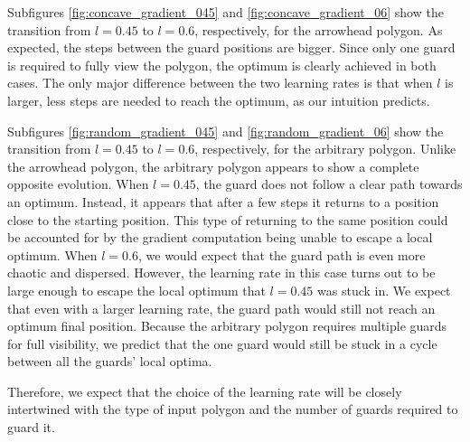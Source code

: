 Subfigures \ref{fig:concave_gradient_045} and \ref{fig:concave_gradient_06} show the transition from $l = 0.45$ to $l = 0.6$, respectively, for the arrowhead polygon. As expected, the steps between the guard positions are bigger. Since only one guard is required to fully view the polygon, the optimum is clearly achieved in both cases. The only major difference between the two learning rates is that when $l$ is larger, less steps are needed to reach the optimum, as our intuition predicts.

Subfigures \ref{fig:random_gradient_045} and \ref{fig:random_gradient_06} show the transition from $l = 0.45$ to $l = 0.6$, respectively, for the arbitrary polygon. Unlike the arrowhead polygon, the arbitrary polygon appears to show a complete opposite evolution. When $l = 0.45$, the guard does not follow a clear path towards an optimum. Instead, it appears that after a few steps it returns to a position close to the starting position. This type of returning to the same position could be accounted for by the gradient computation being unable to escape a local optimum. When $l = 0.6$, we would expect that the guard path is even more chaotic and dispersed. However, the learning rate in this case turns out to be large enough to escape the local optimum that $l = 0.45$ was stuck in. We expect that even with a larger learning rate, the guard path would still not reach an optimum final position. Because the arbitrary polygon requires multiple guards for full visibility, we predict that the one guard would still be stuck in a cycle between all the guards' local optima.

Therefore, we expect that the choice of the learning rate will be closely intertwined with the type of input polygon and the number of guards required to guard it.


